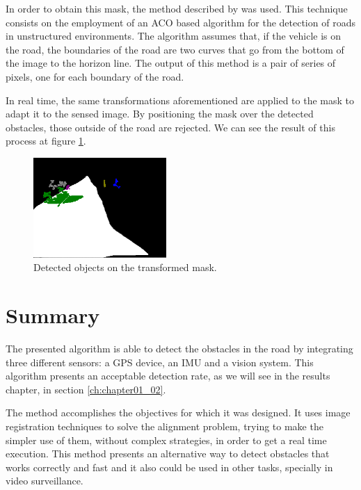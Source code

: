 In order to obtain this mask, the method described by \cite{arnay2009applying} was used. This technique consists on the employment of an \ac{ACO} based algorithm for the detection of roads in unstructured environments. The algorithm assumes that, if the vehicle is on the road, the boundaries of the road are two curves that go from the bottom of the image to the horizon line. The output of this method is a pair of series of pixels, one for each boundary of the road.

In real time, the same transformations aforementioned are applied to the mask to adapt it to the sensed image. By positioning the mask over the detected obstacles, those outside of the road are rejected. We can see the result of this process at figure \ref{fig:cp01_mask_warped}.

\begin{figure}[h!]
\centering
\includegraphics[width=0.45\textwidth]{maskWarped}
\caption{Detected objects on the transformed mask.}\label{fig:cp01_mask_warped}
\end{figure}

\section{Summary}\label{ch:chapter01_03}

The presented algorithm is able to detect the obstacles in the road by integrating three different sensors: a \acs{GPS} device, an \ac{IMU} and a vision system. This algorithm presents an acceptable detection rate, as we will see in the results chapter, in section \ref{ch:chapter01_02}.

The method accomplishes the objectives for which it was designed. It uses image registration techniques to solve the alignment problem, trying to make the simpler use of them, without complex strategies, in order to get a real time execution. This method presents an alternative way to detect obstacles that works correctly and fast and it also could be used in other tasks, specially in video surveillance.

